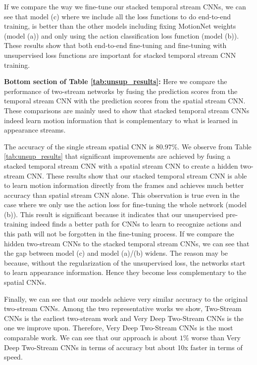 \documentclass[runningheads]{llncs}
\begin{document}
		If we compare the way we fine-tune our stacked temporal stream CNNs, we can see that model (c) where we include all the loss functions to do end-to-end training, is better than the other models including fixing MotionNet weights (model (a)) and only using the action classification loss function (model (b)). These results show that both end-to-end fine-tuning and fine-tuning with unsupervised loss functions are important for stacked temporal stream CNN training. 
		
		
		\noindent  \textbf{Bottom section of Table \ref{tab:unsup_results}:} Here we compare the performance of two-stream networks by fusing the prediction scores from the temporal stream CNN with the prediction scores from the spatial stream CNN. These comparisons are mainly used to show that stacked temporal stream CNNs indeed learn motion information that is complementary to what is learned in appearance streams. 
		
		The accuracy of the single stream spatial CNN is $80.97\%$. We observe from Table \ref{tab:unsup_results} that significant improvements are achieved by fusing a stacked temporal stream CNN with a spatial stream CNN to create a hidden two-stream CNN. These results show that our stacked temporal stream CNN is able to learn motion information directly from the frames and achieves much better accuracy than spatial stream CNN alone. This observation is true even in the case where we only use the action loss for fine-tuning the whole network (model (b)). This result is significant because it indicates that our unsupervised pre-training indeed finds a better path for CNNs to learn to recognize actions and this path will not be forgotten in the fine-tuning process. If we compare the hidden two-stream CNNs to the stacked temporal stream CNNs, we can see that the gap between model (c) and model (a)/(b) widens.  The reason may be because, without the regularization of the unsupervised loss, the networks start to learn appearance information. Hence they become less complementary to the spatial CNNs. 
		
		Finally, we can see that our models achieve very similar accuracy to the original two-stream CNNs. Among the two representative works we show, Two-Stream CNNs \cite{twostream2014} is the earliest two-stream work and Very Deep Two-Stream CNNs \cite{wanggoodpractice2015} is the one we improve upon. Therefore, Very Deep Two-Stream CNNs \cite{wanggoodpractice2015} is the most comparable work. We can see that our approach is about $1\%$ worse than Very Deep Two-Stream CNNs \cite{wanggoodpractice2015} in terms of accuracy but about 10x faster in terms of speed. 
	
\end{document}
